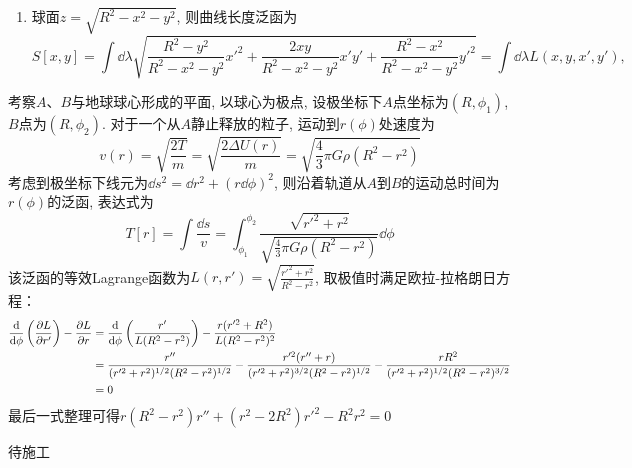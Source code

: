 \begin{solution}
\begin{enumerate}[label=(\arabic*)]
\begin{enumerate}[label=(\arabic{enumi}.\arabic*)]
            \item 球面\( z = \sqrt{R^2 - x^2 - y^2} \), 则曲线长度泛函为
            \[
                S[x,y] = \int \dd \lambda \sqrt{\frac{R^2 - y^2}{R^2 - x^2 - y^2} x'^2 + \frac{2xy}{R^2 - x^2 - y^2} x' y' + \frac{R^2 - x^2}{R^2 - x^2 - y^2} y'^2} = \int \dd \lambda L\left(x, y, x',y'\right),
            \]
        \end{enumerate}
    \end{enumerate}
\end{solution}

\begin{solution}
    考察\(A\)、\(B\)与地球球心形成的平面, 以球心为极点, 设极坐标下\(A\)点坐标为\( (R,\phi_1) \), \(B\)点为\( (R,\phi_2) \). 
    对于一个从\(A\)静止释放的粒子, 运动到\( r(\phi) \)处速度为
    \[
        v(r) = \sqrt{\frac{2T}{m}} = \sqrt{\frac{2\Delta U(r)}{m}} = \sqrt{\frac43 \pi G \rho (R^2-r^2)}
    \]
    考虑到极坐标下线元为\( \dd s^2 = \dd r^2 + (r\dd \phi)^2 \), 则沿着轨道从\(A\)到\(B\)的运动总时间为\( r(\phi) \)的泛函, 表达式为
    \[
        T[r] = \int \frac{\dd s}{v}
             = \int_{\phi_1}^{\phi_2} \frac{ \sqrt{r'^2+r^2} }{ \sqrt{\frac43 \pi G \rho (R^2-r^2)} }\dd \phi
    \]
    该泛函的等效Lagrange函数为\( L(r,r')= \sqrt{\frac{r'^2+r^2}{R^2-r^2}} \), 取极值时满足欧拉-拉格朗日方程：
    \[
    \begin{aligned}
        \frac{\dd}{\dd \phi} \left( \frac{\partial L}{\partial r'} \right) - \frac{\partial L}{\partial r}
        & = \frac{\dd}{\dd \phi} \left( \frac{r'}{L(R^2-r^2)} \right) - \frac{r(r'^2+R^2)}{L(R^2-r^2)^2} \\
        & = \frac{r''}{(r'^2+r^2)^{1/2}(R^2-r^2)^{1/2}} - 
            \frac{r'^2(r''+r)}{(r'^2+r^2)^{3/2}(R^2-r^2)^{1/2}} - 
            \frac{rR^2}{(r'^2+r^2)^{1/2}(R^2-r^2)^{3/2}} \\
        & = 0
    \end{aligned}
    \]
    最后一式整理可得\( r(R^2-r^2)r''+(r^2-2R^2)r'^2-R^2r^2 = 0 \)
\end{solution}

\begin{solution}
    待施工
\end{solution}

